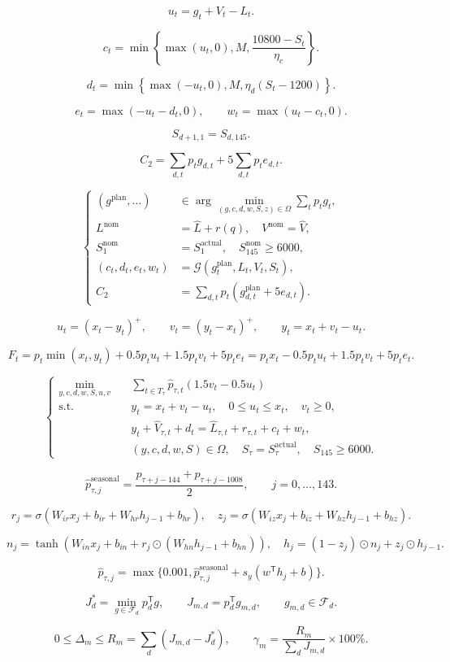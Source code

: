 \[
u_t=g_t+V_t-L_t.
\]

\[
c_t=\min\left\{\max(u_t,0),M,\frac{10800-S_t}{\eta_c}\right\}.
\]

\[
d_t=\min\left\{\max(-u_t,0),M,\eta_d(S_t-1200)\right\}.
\]

\[
e_t=\max(-u_t-d_t,0),\qquad w_t=\max(u_t-c_t,0).
\]

\[
S_{d+1,1}=S_{d,145}.
\]

\[
C_2=\sum_{d,t}p_tg_{d,t}+5\sum_{d,t}p_te_{d,t}.
\]

\[
\boxed{\left\{\begin{aligned}(g^{\mathrm{plan}},\ldots)&\in\arg\min_{(g,c,d,w,S,z)\in\Omega}\sum_t p_tg_t,\\L^{\mathrm{nom}}&=\hat L+r(q),\quad V^{\mathrm{nom}}=\hat V,\\S_1^{\mathrm{nom}}&=S_1^{\mathrm{actual}},\quad S_{145}^{\mathrm{nom}}\geq6000,\\(c_t,d_t,e_t,w_t)&=\mathcal G(g_t^{\mathrm{plan}},L_t,V_t,S_t),\\C_2&=\sum_{d,t}p_t(g_{d,t}^{\mathrm{plan}}+5e_{d,t}).\end{aligned}\right.}
\]

\[
u_t=(x_t-y_t)^+,\qquad v_t=(y_t-x_t)^+,\qquad y_t=x_t+v_t-u_t.
\]

\[
F_t=p_t\min(x_t,y_t)+0.5p_tu_t+1.5p_tv_t+5p_te_t=p_tx_t-0.5p_tu_t+1.5p_tv_t+5p_te_t.
\]

\[
\boxed{\left\{\begin{aligned}\min_{y,c,d,w,S,u,v}\quad&\sum_{t\in T_\tau}\hat p_{\tau,t}(1.5v_t-0.5u_t)\\\mathrm{s.t.}\quad&y_t=x_t+v_t-u_t,\quad0\le u_t\le x_t,\quad v_t\ge0,\\&y_t+\hat V_{\tau,t}+d_t=\hat L_{\tau,t}+r_{\tau,t}+c_t+w_t,\\&(y,c,d,w,S)\in\Omega,\quad S_\tau=S_\tau^{\mathrm{actual}},\quad S_{145}\ge6000.\end{aligned}\right.}
\]

\[
\hat p^{\mathrm{seasonal}}_{\tau,j}=\frac{p_{\tau+j-144}+p_{\tau+j-1008}}2,\qquad j=0,\ldots,143.
\]

\[
r_j=\sigma(W_{ir}x_j+b_{ir}+W_{hr}h_{j-1}+b_{hr}),\quad z_j=\sigma(W_{iz}x_j+b_{iz}+W_{hz}h_{j-1}+b_{hz}).
\]

\[
n_j=\tanh(W_{in}x_j+b_{in}+r_j\odot(W_{hn}h_{j-1}+b_{hn})),\quad h_j=(1-z_j)\odot n_j+z_j\odot h_{j-1}.
\]

\[
\hat p_{\tau,j}=\max\{0.001,\hat p^{\mathrm{seasonal}}_{\tau,j}+s_y(w^\mathsf{T}h_j+b)\}.
\]

\[
J_d^*=\min_{g\in\mathcal F_d}p_d^\mathsf{T}g,\qquad J_{m,d}=p_d^\mathsf{T}g_{m,d},\qquad g_{m,d}\in\mathcal F_d.
\]

\[
0\le\Delta_m\le R_m=\sum_d(J_{m,d}-J_d^*),\qquad \gamma_m=\frac{R_m}{\sum_dJ_{m,d}}\times100\%.
\]